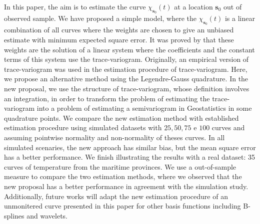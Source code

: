 \documentclass[]{interact}
\theoremstyle{plain}%
\theoremstyle{definition}
\theoremstyle{remark}
\begin{document}
In this paper, the aim is to estimate the curve \(\chi_{\bm{s}_0}(t)\) at a location \(\bm{s}_0\) out of observed sample. We have proposed a simple model, where the \(\chi_{\bm{s}_0}(t)\) is a linear combination of all curves where the weights are chosen to give an unbiased estimate with minimum expected square error. It was proved by \citet{giraldo2011ordinary} that these weights are the solution of a linear system where the coefficients and the constant terms of this system use the trace-variogram. Originally, an empirical version of trace-variogram was used in the estimation procedure of trace-variogram. Here, we propose an alternative method using the Legendre-Gauss quadrature. In the new proposal, we use the structure of trace-variogram, whose definition involves an integration, in order to transform the problem of estimating the trace-variogram into a problem of estimating a semivariogram in Geostatistics in some quadrature points. We compare the new estimation method with established estimation procedure using simulated datasets with \(25,50,75\) e \(100\) curves and assuming pointwise normality and non-normality of theses curves. In all simulated scenaries, the new approach has similar bias, but the mean square error has a better performance. We finish illustrating the results with a real dataset: 35 curves of temperature from the maritime provinces. We use a out-of-sample measure to compare the two estimation methods, where we observed that the new proposal has a better performance in agreement with the simulation study. Additionally, future works will adapt the new estimation procedure of an unmonitered curve presented in this paper for other basis functions including B-splines and wavelets.



\end{document}
